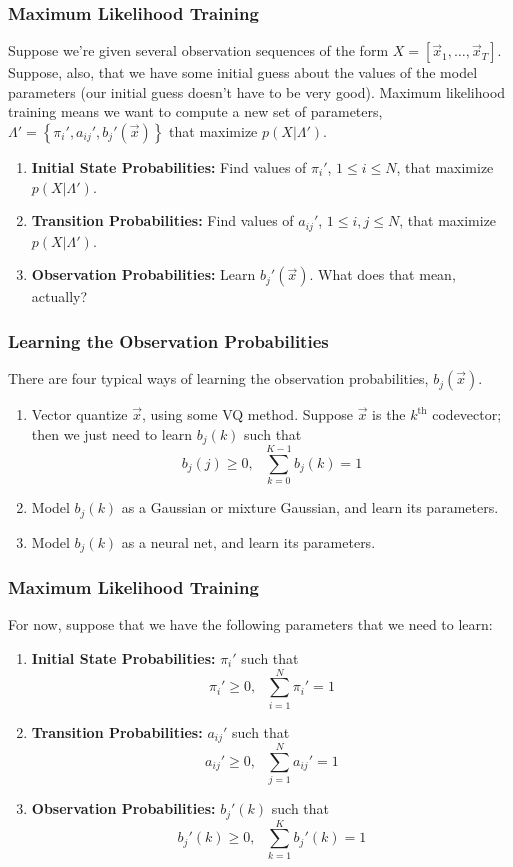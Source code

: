 \documentclass{beamer}
\begin{document}
\begin{frame}
  \frametitle{Maximum Likelihood Training}
  
  Suppose we're given several observation sequences of the form
  $X=[\vec{x}_1,\ldots,\vec{x}_T]$.  Suppose, also, that we have some
  initial guess about the values of the model parameters (our initial
  guess doesn't have to be very good).  Maximum likelihood training
  means we want to compute a new set of parameters,
  $\Lambda'=\left\{\pi_i',a_{ij}',b_j'(\vec{x})\right\}$ that maximize
  $p(X|\Lambda')$.
  \begin{enumerate}
  \item {\bf Initial State Probabilities:} Find values of $\pi_i'$, $1\le
    i\le N$, that maximize $p(X|\Lambda')$.
  \item {\bf Transition Probabilities:} Find values of $a_{ij}'$, $1\le
    i,j\le N$, that maximize $p(X|\Lambda')$.
  \item {\bf Observation Probabilities:} Learn $b_j'(\vec{x})$.  What does that
    mean, actually?
  \end{enumerate}
\end{frame}

\begin{frame}
  \frametitle{Learning the Observation Probabilities}

  There are four typical ways of learning the observation probabilities, $b_j(\vec{x})$.
    \begin{enumerate}
    \item Vector quantize $\vec{x}$, using some VQ method.  Suppose
      $\vec{x}$ is the $k^{\textrm{th}}$ codevector; then we just need
      to learn $b_j(k)$ such that
      \[
      b_j(j)\ge 0,~~~\sum_{k=0}^{K-1} b_j(k)=1
      \]
    \item Model $b_j(k)$ as a Gaussian or mixture Gaussian, and learn
      its parameters.
    \item Model $b_j(k)$ as a  neural net, and learn its parameters.
    \end{enumerate}
\end{frame}
  
\begin{frame}
  \frametitle{Maximum Likelihood Training}
  
  For now, suppose that we have the following parameters that we need to learn:
  \begin{enumerate}
  \item {\bf Initial State Probabilities:} $\pi_i'$ such that
    \[
    \pi_i' \ge 0,~~~\sum_{i=1}^N \pi_i' = 1
    \]
  \item {\bf Transition Probabilities:} $a_{ij}'$ such that
    \[
    a_{ij}'\ge 0,~~~\sum_{j=1}^N a_{ij}' =1
    \]
  \item {\bf Observation Probabilities:} $b_j'(k)$ such that
    \[
    b_j'(k)\ge 0,~~~\sum_{k=1}^{K} b_j'(k)=1
    \]
  \end{enumerate}
\end{frame}
\end{document}

